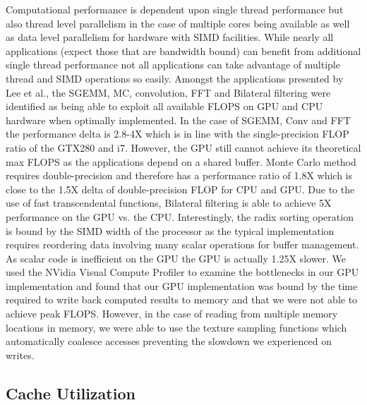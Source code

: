 \documentclass[conference]{IEEEtran}
\begin{document}
Computational performance is dependent upon single thread performance but also thread level parallelism in the case of multiple cores being available as well as data level parallelism for hardware with SIMD facilities. While nearly all applications (expect those that are bandwidth bound) can benefit from additional single thread performance not all applications can take advantage of multiple thread and SIMD operations so easily. Amongst the applications presented by Lee et al., the SGEMM, MC, convolution, FFT and Bilateral filtering were identified as being able to exploit all available FLOPS on GPU and CPU hardware when optimally implemented. In the case of SGEMM, Conv and FFT the performance delta is 2.8-4X which is in line with the single-precision FLOP ratio of the GTX280 and i7. However, the GPU still cannot achieve its theoretical max FLOPS as the applications depend on a shared buffer. Monte Carlo method requires double-precision and therefore has a performance ratio of 1.8X which is close to the 1.5X delta of double-precision FLOP for CPU and GPU. Due to the use of fast transcendental functions, Bilateral filtering is able to achieve 5X performance on the GPU vs. the CPU. Interestingly, the radix sorting operation is bound by the SIMD width of the processor as the typical implementation requires reordering data involving many scalar operations for buffer management. As scalar code is inefficient on the GPU the GPU is actually 1.25X slower. We used the NVidia Visual Compute Profiler to examine the bottlenecks in our GPU implementation and found that our GPU implementation was bound by the time required to write back computed results to memory and that we were not able to achieve peak FLOPS. However, in the case of reading from multiple memory locations in memory, we were able to use the texture sampling functions which automatically coalesce accesses preventing the slowdown we experienced on writes.

\subsection{Cache Utilization}
\end{document}
